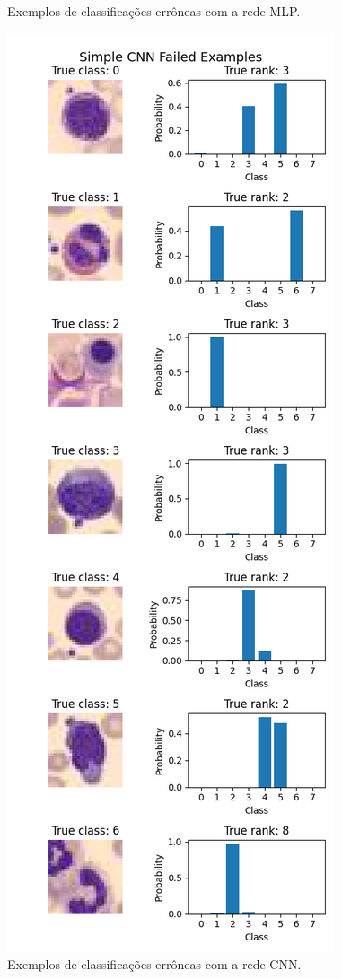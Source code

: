 \documentclass[final,5p]{elsarticle}
\numberwithin{equation}{section}
\begin{document}
\begin{figure}[H]
            \caption{Exemplos de classificações errôneas com a rede MLP.}\label{fig:ErrosMLP}
        \end{figure}

        \begin{figure}[H]
            \includegraphics[width=0.8\columnwidth]{CNN_Simple_fails.png}
            \caption{Exemplos de classificações errôneas com a rede CNN.}\label{fig:ErrosCNN}
        \end{figure}
\end{document}
